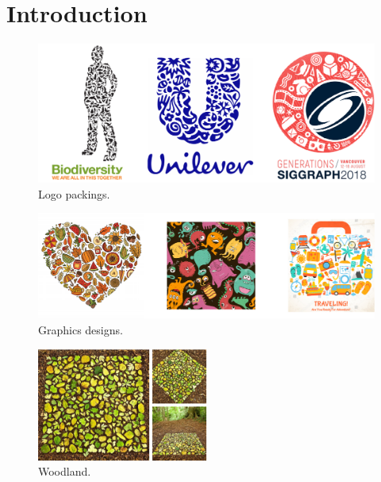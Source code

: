 
\chapter{Introduction}
\label{chapter_introduction}

\begin{figure}
\centering
\includegraphics[width=1.0\textwidth]{figures/intro/logos.pdf} 
\caption{\label{fig_logo_packings} 
Logo packings. }
\end{figure}

\begin{figure}
\centering
\includegraphics[width=1.0\textwidth]{figures/intro/graphics_designs.pdf} 
\caption{\label{fig_graphics_designs} 
Graphics designs. }
\end{figure}



\begin{figure}
\centering
\includegraphics[width=0.5\textwidth]{figures/intro/woodland.jpg} 
\caption{\label{fig_woodland} 
Woodland. }
\end{figure}

